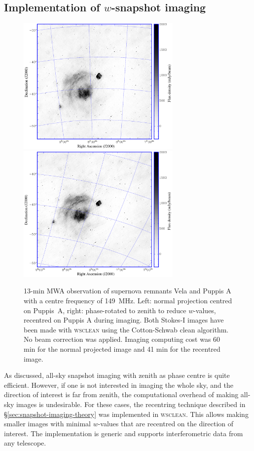 \documentclass[useAMS,usenatbib]{mn2e}
\begin{document}
\subsection{Implementation of $w$-snapshot imaging} \label{sec:snapshot-imaging-implementation}
\begin{figure}
\begin{center}
\includegraphics[width=8cm]{img/vela-normal-projection}
\includegraphics[width=8cm]{img/vela-zenith-projection}
\caption{13-min MWA observation of supernova remnants Vela and Puppis A with a centre frequency of 149~MHz. Left: normal projection centred on Puppis~A, right: phase-rotated to zenith to reduce $w$-values, recentred on Puppis A during imaging. Both Stokes-I images have been made with \textsc{wsclean} using the Cotton-Schwab clean algorithm. No beam correction was applied. Imaging computing cost was 60 min for the normal projected image and 41 min for the recentred image.}
\label{fig:vela-projection-example}
\end{center}
\end{figure}
As discussed, all-sky snapshot imaging with zenith as phase centre is quite efficient. However, if one is not interested in imaging the whole sky, and the direction of interest is far from zenith, the computational overhead of making all-sky images is undesirable. For these cases, the recentring technique described in \S\ref{sec:snapshot-imaging-theory} was implemented in \textsc{wsclean}. This allows making smaller images with minimal $w$-values that are recentred on the direction of interest. The implementation is generic and supports interferometric data from any telescope.
\end{document}
